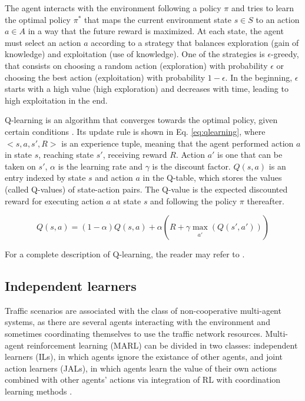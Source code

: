 \documentclass{RITA}
\begin{document}
The agent interacts with the environment following a policy $\pi$ and tries to learn the optimal policy $\pi^*$ that maps the current environment state $s \in S$ to an action $a \in A$ in a way that the future reward is maximized. At each state, the agent must select an action $a$ according to a strategy that balances exploration (gain of knowledge) and exploitation (use of knowledge). One of the strategies is $\epsilon$-greedy, that consists on choosing a random action (exploration) with probability $\epsilon$ or choosing the best action (exploitation) with probability $1 - \epsilon$. In the beginning, $\epsilon$ starts with a high value (high exploration) and decreases with time, leading to high exploitation in the end.

Q-learning is an algorithm that converges towards the optimal policy, given certain conditions \cite{Watkins&Dayan1992}. Its update rule is shown in Eq. \eqref{eq:qlearning}, where $<s,a,s',R>$ is an experience tuple, meaning that the agent performed action $a$ in state $s$, reaching state $s'$, receiving reward $R$. Action $a'$ is one that can be taken on $s'$, $\alpha$ is the learning rate and $\gamma$ is the discount factor. $Q(s,a)$ is an entry indexed by state $s$ and action $a$ in the Q-table, which stores the values (called Q-values) of state-action pairs. The Q-value is the expected discounted reward for executing action $a$ at
state $s$ and following the policy $\pi$ thereafter.

\begin{equation}
\label{eq:qlearning}
Q(s,a) = (1 - \alpha) Q(s,a) + \alpha (R + \gamma \max_{\substack{a'}}(Q(s',a')))
\end{equation}

For a complete description of Q-learning, the reader may refer to \cite{Watkins&Dayan1992}.



\subsection{Independent learners} 
Traffic scenarios are associated with the class of non-cooperative multi-agent systems, as there are several agents interacting with the environment and sometimes coordinating themselves to use the traffic network resources. Multi-agent reinforcement learning (MARL) can be divided in two classes: independent learners (ILs), in which agents ignore the existance of other agents, and joint action learners (JALs), in which agents learn the value of their own actions combined with other agents' actions via integration of RL with coordination learning methods \cite{Claus&Boutilier1998}. 
\end{document}

